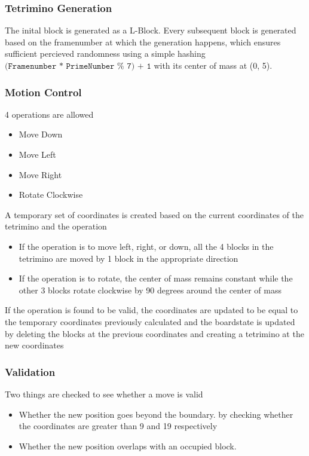 \subsubsection{Tetrimino Generation }
\label{subsubsection:tetgen}
The inital block is generated as a L-Block. 
Every subsequent block is generated based on the framenumber 
at which the generation happens, which ensures sufficient percieved 
randomness using a simple hashing
 \( \texttt{(Framenumber * PrimeNumber\ \%\ 7) + 1} \) 
with its center of mass at (0, 5).
\subsubsection{Motion Control }
\label{subsubsection:motioncontrol}
4 operations are allowed
\begin{itemize}
    \item Move Down
    \item Move Left
    \item Move Right
    \item Rotate Clockwise
\end{itemize}
 A temporary set of coordinates is created based on the current coordinates of the tetrimino and the operation 
 \begin{itemize}
     \item If the operation is to move left, right, or down, all the 4 blocks in the tetrimino are moved by 1 block in the appropriate direction
     \item If the operation is to rotate, the center of mass remains constant while the other 3 blocks rotate clockwise by 90 degrees around the center of mass
 \end{itemize}
 If the operation is found to be valid, the coordinates are updated to
 be equal to the temporary coordinates previously calculated and the boardstate is updated by deleting the blocks at the previous coordinates
 and creating a tetrimino at the new coordinates

\subsubsection{Validation }
\label{subsubsection:validation}
Two things are checked to see whether a move is valid 
\begin{itemize}
    \item Whether the new position goes beyond the boundary. 
    by checking  whether the coordinates are greater than 9 and 19 respectively
    \item Whether the new position overlaps with an occupied block. 
   
\end{itemize}

